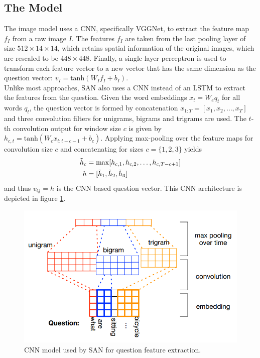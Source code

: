 \documentclass{article}
\begin{document}
\subsection{The Model}
The image model uses a CNN, specifically VGGNet, to extract the feature map $f_I$ from a raw image $I$. The features $f_I$ are taken from the last pooling layer of size $512 \times 14 \times 14$, which retains spatial information of the original images, which are rescaled to be $448 \times 448$. Finally, a single layer perceptron is used to transform each feature vector to a new vector that has the same dimension as the question vector: $v_I=\text{tanh}(W_If_I+b_I)$.\\
Unlike most approaches, SAN also uses a CNN instead of an LSTM to extract the features from the question. Given the word embeddings $x_t = W_eq_t$ for all words $q_t$, the question vector is formed by concatenation $x_{1:T} = [x_1,x_2,\ldots,x_T]$ and three convolution filters for unigrams, bigrams and trigrams are used. The $t$-th convolution output for window size $c$ is given by $h_{c,t} = \text{tanh}(W_cx_{t:t+c-1}+b_c)$. Applying max-pooling over the feature maps for convolution size $c$ and concatenating for sizes $c = \{1, 2, 3\}$ yields
\begin{align*}
    \Tilde{h}_c &= \max[h_{c,1}, h_{c,2},\ldots,h_{c,T-c+1}]\\
    h &= [\Tilde{h}_1, \Tilde{h}_2, \Tilde{h}_3]
\end{align*}
and thus $v_Q = h$ is the CNN based question vector. This CNN architecture is depicted in figure \ref{sanCNN}.\\

    \begin{figure}[ht]
    	\centering
            \includegraphics[width=0.75\linewidth]{sanCNN.PNG}
    	\caption{CNN model used by SAN for question feature extraction.}
    	\label{sanCNN}
    \end{figure}
\end{document}
